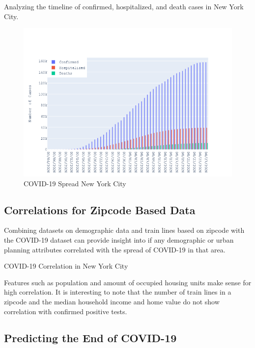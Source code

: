 \documentclass{homework}
\begin{document}
Analyzing the timeline of confirmed, hospitalized, and death cases in New York City.

\begin{figure}[H]
  \centering
  \includegraphics[scale=0.45]{task5/task5_timeline.png}
  \caption{COVID-19 Spread New York City}
\end{figure}

\newpage
\subsection{Correlations for Zipcode Based Data}

Combining datasets on demographic data and train lines based on zipcode with the COVID-19 dataset can provide insight into if any demographic or urban planning attributes correlated with the spread of COVID-19 in that area. 

\begin{table}[H]
  \caption{COVID-19 Correlation in New York City}
  \label{Task 5 Correlation}
  \centering
  
\end{table}

Features such as population and amount of occupied housing units make sense for high correlation. It is interesting to note that the number of train lines in a zipcode and the median household income and home value do not show correlation with confirmed positive tests.

\newpage
\subsection{Predicting the End of COVID-19}
\end{document}

